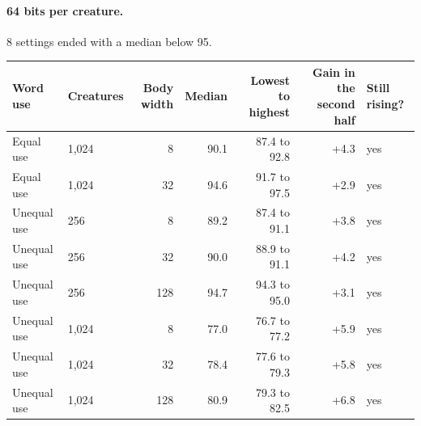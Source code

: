 \paragraph{64 bits per creature.} 8 settings ended with a median below 95.

\begin{center}\small
\begin{tabular}{@{}llrrrrl@{}}
\toprule
Word use & Creatures & Body width & Median & Lowest to highest & Gain in the second half & Still rising?\\
\midrule
Equal use & 1,024 & 8 & 90.1 & 87.4 to 92.8 & +4.3 & yes\\
Equal use & 1,024 & 32 & 94.6 & 91.7 to 97.5 & +2.9 & yes\\
Unequal use & 256 & 8 & 89.2 & 87.4 to 91.1 & +3.8 & yes\\
Unequal use & 256 & 32 & 90.0 & 88.9 to 91.1 & +4.2 & yes\\
Unequal use & 256 & 128 & 94.7 & 94.3 to 95.0 & +3.1 & yes\\
Unequal use & 1,024 & 8 & 77.0 & 76.7 to 77.2 & +5.9 & yes\\
Unequal use & 1,024 & 32 & 78.4 & 77.6 to 79.3 & +5.8 & yes\\
Unequal use & 1,024 & 128 & 80.9 & 79.3 to 82.5 & +6.8 & yes\\
\bottomrule
\end{tabular}
\end{center}
